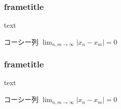 \documentclass[dvipdfmx,12pt]{beamer}
\begin{document}
\begin{frame}
\frametitle{frametitle}
text

\begin{exampleblock}{コーシー列}
$\displaystyle\lim_{n,m\rightarrow\infty}|x_n - x_m|=0$
\end{exampleblock}

\end{frame}

\begin{frame}
\frametitle{frametitle}
text

\begin{exampleblock}{コーシー列}
$\displaystyle\lim_{n,m\rightarrow\infty}|x_n - x_m|=0$
\end{exampleblock}

\end{frame}
\end{document}
